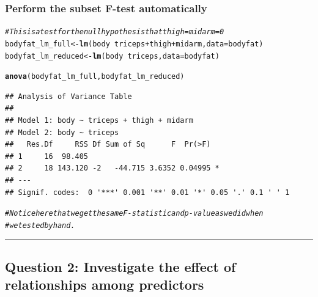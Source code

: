 \documentclass{article}\usepackage[]{graphicx}\usepackage[]{color}
\makeatletter
\newcommand{\hlcom}[1]{\textcolor[rgb]{0.678,0.584,0.686}{\textit{#1}}}%
\newcommand{\hlopt}[1]{\textcolor[rgb]{0,0,0}{#1}}%
\newcommand{\hlstd}[1]{\textcolor[rgb]{0.345,0.345,0.345}{#1}}%
\newcommand{\hlkwb}[1]{\textcolor[rgb]{0.69,0.353,0.396}{#1}}%
\newcommand{\hlkwc}[1]{\textcolor[rgb]{0.333,0.667,0.333}{#1}}%
\newcommand{\hlkwd}[1]{\textcolor[rgb]{0.737,0.353,0.396}{\textbf{#1}}}%
\newenvironment{kframe}{%
 \def\at@end@of@kframe{}%
 \ifinner\ifhmode%
  \def\at@end@of@kframe{\end{minipage}}%
  \begin{minipage}{\columnwidth}%
 \fi\fi%
 \def\FrameCommand##1{\hskip\@totalleftmargin \hskip-\fboxsep
 \colorbox{shadecolor}{##1}\hskip-\fboxsep
     \hskip-\linewidth \hskip-\@totalleftmargin \hskip\columnwidth}%
 \MakeFramed {\advance\hsize-\width
   \@totalleftmargin\z@ \linewidth\hsize
   \@setminipage}}%
 {\par\unskip\endMakeFramed%
 \at@end@of@kframe}
\newenvironment{knitrout}{}{} %
\makeatother
\begin{document}
\subsubsection*{Perform the subset F-test automatically}
\begin{knitrout}
\color{fgcolor}\begin{kframe}
\begin{alltt}
\hlcom{# This is a test for the null hypothesis that thigh = midarm= 0}
\hlstd{bodyfat_lm_full} \hlkwb{<-} \hlkwd{lm}\hlstd{(body} \hlopt{~} \hlstd{triceps} \hlopt{+} \hlstd{thigh} \hlopt{+} \hlstd{midarm,} \hlkwc{data} \hlstd{= bodyfat)}
\hlstd{bodyfat_lm_reduced} \hlkwb{<-} \hlkwd{lm}\hlstd{(body} \hlopt{~} \hlstd{triceps,} \hlkwc{data} \hlstd{= bodyfat)}

\hlkwd{anova}\hlstd{(bodyfat_lm_full, bodyfat_lm_reduced)}
\end{alltt}
\begin{verbatim}
## Analysis of Variance Table
## 
## Model 1: body ~ triceps + thigh + midarm
## Model 2: body ~ triceps
##   Res.Df     RSS Df Sum of Sq      F  Pr(>F)  
## 1     16  98.405                              
## 2     18 143.120 -2   -44.715 3.6352 0.04995 *
## ---
## Signif. codes:  0 '***' 0.001 '**' 0.01 '*' 0.05 '.' 0.1 ' ' 1
\end{verbatim}
\begin{alltt}
\hlcom{# Notice here that we get the same F-statistic and p-value as we did when}
\hlcom{# we tested by hand.}
\end{alltt}
\end{kframe}
\end{knitrout}

\medskip
\hrule
\medskip

\subsection*{Question 2: Investigate the effect of relationships among predictors}
\end{document}
